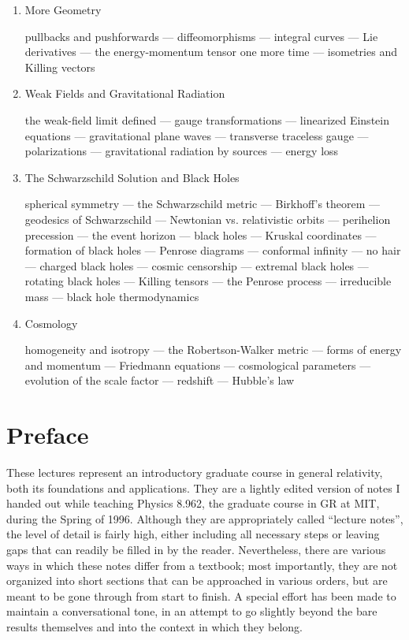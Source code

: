 \documentclass[12pt]{article}
\begin{document}
\begin{enumerate}
\item{More Geometry}

pullbacks and pushforwards --- diffeomorphisms --- integral
  curves --- Lie derivatives --- the energy-momentum tensor one
  more time --- isometries and Killing vectors

\item{Weak Fields and Gravitational Radiation}

the weak-field limit defined --- gauge transformations --- linearized
  Einstein equations --- gravitational plane waves --- transverse
  traceless gauge --- polarizations --- gravitational radiation by
  sources --- energy loss

\item{The Schwarzschild Solution and Black Holes}

spherical symmetry --- the Schwarzschild metric ---
  Birkhoff's theorem --- geodesics of Schwarzschild ---
  Newtonian vs. relativistic orbits --- perihelion precession ---
  the event horizon --- black holes --- Kruskal coordinates ---
  formation of black holes --- Penrose diagrams --- conformal infinity ---
  no hair --- charged black holes --- cosmic censorship --- extremal
  black holes --- rotating black holes --- Killing tensors --- the
  Penrose process --- irreducible mass --- black hole thermodynamics

\item{Cosmology}

homogeneity and isotropy --- the Robertson-Walker metric ---
  forms of energy and momentum --- Friedmann equations ---
  cosmological parameters --- evolution of the scale factor ---
  redshift --- Hubble's law

\end{enumerate}

\eject

\section*{Preface}

These lectures represent an introductory graduate course in general
relativity, both its foundations and applications.  They are a lightly
edited version of notes I handed out while teaching Physics
8.962, the graduate course in GR at MIT, during the Spring of 1996.
Although they are appropriately called ``lecture notes'', the level
of detail is fairly high, either including all necessary steps or
leaving gaps that can readily be filled in by the reader.  Nevertheless,
there are various ways in which these notes differ from a textbook;
most importantly, they are not organized into short sections that
can be approached in various orders, but are meant to be gone through from
start to finish.  A special effort has been made to maintain a 
conversational tone, in an attempt to go slightly beyond the bare
results themselves and into the context in which they belong.
\end{document}

